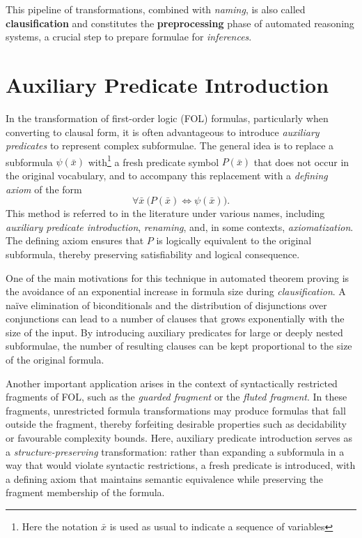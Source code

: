 This pipeline of transformations, combined with \emph{naming}, is also called \textbf{clausification} and  constitutes the \textbf{preprocessing} phase of automated reasoning systems, a crucial step to prepare formulae for \emph{inferences}.

\section{Auxiliary Predicate Introduction}\label{sec:auxiliary_predicate_introduction}

In the transformation of first-order logic (FOL) formulas, particularly when converting to clausal form, it is often advantageous to introduce \emph{auxiliary predicates} to represent complex subformulae. The general idea is to replace a subformula \(\psi(\bar{x})\) with\footnote{Here the notation \(\bar{x}\) is used as usual to indicate a sequence of variables} a fresh predicate symbol \(P(\bar{x})\) that does not occur in the original vocabulary, and to accompany this replacement with a \emph{defining axiom} of the form
\[
\forall \bar{x}\ \big(P(\bar{x}) \iff \psi(\bar{x})\big).
\]
This method is referred to in the literature under various names, including \emph{auxiliary predicate introduction}, \emph{renaming}, and, in some contexts, \emph{axiomatization}. The defining axiom ensures that \(P\) is logically equivalent to the original subformula, thereby preserving satisfiability and logical consequence.

One of the main motivations for this technique in automated theorem proving is the avoidance of an exponential increase in formula size during \emph{clausification}.
A naïve elimination of biconditionals and the distribution of disjunctions over conjunctions can lead to a number of clauses that grows exponentially with the size of the input.
By introducing auxiliary predicates for large or deeply nested subformulae, the number of resulting clauses can be kept proportional to the size of the original formula.

Another important application arises in the context of syntactically restricted fragments of FOL, such as the \emph{guarded fragment} or the \emph{fluted fragment}.
In these fragments, unrestricted formula transformations may produce formulas that fall outside the fragment, thereby forfeiting desirable properties such as decidability or favourable complexity bounds.
Here, auxiliary predicate introduction serves as a \emph{structure-preserving} transformation: rather than expanding a subformula in a way that would violate syntactic restrictions, a fresh predicate is introduced, with a defining axiom that maintains semantic equivalence while preserving the fragment membership of the formula.

